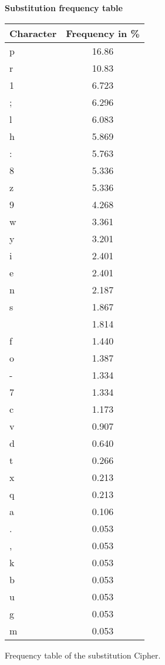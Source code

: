 \documentclass{uva-inf-bachelor-thesis}
\begin{document}
\begin{minipage}{0.5\textwidth}
\vspace{-16pt}
\centering
\textbf{Substitution frequency table}
\begin{tabular}{l|c}\toprule
Character & Frequency in \%     \\
\midrule
p         & 16.86 \\
r         & 10.83 \\
1         & 6.723 \\
;         & 6.296 \\
l         & 6.083 \\
h         & 5.869 \\
:         & 5.763 \\
8         & 5.336 \\
z         & 5.336 \\
9         & 4.268 \\
w         & 3.361 \\
y         & 3.201 \\
i         & 2.401 \\
e         & 2.401 \\
n         & 2.187 \\
s         & 1.867 \\
          & 1.814 \\
f         & 1.440 \\
o         & 1.387 \\
-         & 1.334 \\
7         & 1.334 \\
c         & 1.173 \\
v         & 0.907 \\
d         & 0.640 \\
t         & 0.266 \\
x         & 0.213 \\
q         & 0.213 \\
a         & 0.106 \\
.         & 0.053 \\
,         & 0.053 \\
k         & 0.053 \\
b         & 0.053 \\
u         & 0.053 \\
g         & 0.053 \\
m         & 0.053 \\ \bottomrule
\end{tabular}
\caption{Frequency table of the substitution Cipher.}
\label{subcipher}
\end{minipage}
\end{document}
